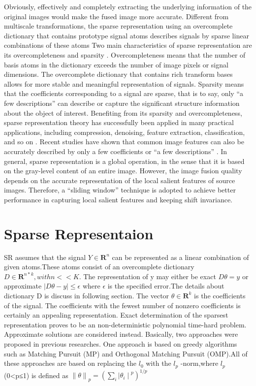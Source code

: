 Obviously, effectively and completely extracting the underlying information of the original images would make the fused image more accurate. Different from multiscale transformations, the sparse representation using an overcomplete dictionary that contains prototype signal atoms describes signals by sparse linear combinations of these atoms \cite{30-34} Two main characteristics of sparse representation are its overcompleteness and sparsity \cite{32}. Overcompleteness means that the number of basis atoms in the dictionary exceeds the number of image pixels or signal dimensions. The overcomplete dictionary that contains rich transform bases allows for more stable and meaningful representation of signals. Sparsity means that the coefficients corresponding to a signal are sparse, that is to say, only “a few descriptions” can describe or capture the significant structure information about the object of interest. Benefiting from its sparsity and overcompleteness, sparse representation theory has successfully been applied in many practical applications, including compression, denoising, feature extraction, classification, and so on \cite{32-34}. Recent studies have shown
that common image features can also be accurately described
by only a few coefficients or “a few descriptions” \cite{32}. 
In general, sparse representation is a global operation, in the sense that it is based on the gray-level content of an entire image. However, the image fusion quality depends on the accurate
representation of the local salient features of source images.
Therefore, a “sliding window” technique is adopted to achieve
better performance in capturing local salient features and keeping shift invariance.

\section{Sparse Representaion}
SR assumes that the signal \(Y \in {\textbf{R}}^{n}\) can be represented as a linear combination of given atoms.These atoms consist of an overcomplete dictionary \( D\in {\textbf{R}}^{n*k} 
, with n<<K \). The representation of y may either be exact \(D\theta=y \) or approximate \(|D\theta -y|\leq \epsilon \)  where 
\(\epsilon \) is the specified error.The details about dictionary D is discuss in following section. The vector \(\theta \in {\textbf{R}}^{k} \) is the coefficients of the signal. The coefficients with the fewest number of nonzero coefficients is certainly an appealing representation. Exact determination of the sparsest representation proves to be an non-deterministic polynomial time-hard problem.
Approximate solutions are considered instead. Basically, two approaches were proposed in previous researches. One approach is based on greedy algorithms such as Matching Pursuit (MP) and Orthogonal Matching Pursuit (OMP).All of these approaches are based on replacing the \({l}_{0} \) with the \( { l}_{p} \) -norm,where \({l}_{p}\) (0<p≤1) is defined as \({\parallel \theta \parallel}_{p}={\left(\sum_{i} { \mid {\theta }_{i}\mid}^{p} \right)}^{1/p}  \) \hfill \break

